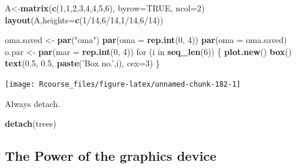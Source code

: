 \documentclass[]{book}
\newenvironment{Shaded}{\begin{snugshade}}{\end{snugshade}}
\newcommand{\KeywordTok}[1]{\textcolor[rgb]{0.13,0.29,0.53}{\textbf{{#1}}}}
\newcommand{\DataTypeTok}[1]{\textcolor[rgb]{0.13,0.29,0.53}{{#1}}}
\newcommand{\DecValTok}[1]{\textcolor[rgb]{0.00,0.00,0.81}{{#1}}}
\newcommand{\FloatTok}[1]{\textcolor[rgb]{0.00,0.00,0.81}{{#1}}}
\newcommand{\StringTok}[1]{\textcolor[rgb]{0.31,0.60,0.02}{{#1}}}
\newcommand{\OtherTok}[1]{\textcolor[rgb]{0.56,0.35,0.01}{{#1}}}
\newcommand{\NormalTok}[1]{{#1}}
\theoremstyle{definition}
\theoremstyle{definition}
\theoremstyle{remark}
\begin{document}
\begin{Shaded}
\begin{Highlighting}[]
\NormalTok{A<-}\KeywordTok{matrix}\NormalTok{(}\KeywordTok{c}\NormalTok{(}\DecValTok{1}\NormalTok{,}\DecValTok{1}\NormalTok{,}\DecValTok{2}\NormalTok{,}\DecValTok{3}\NormalTok{,}\DecValTok{4}\NormalTok{,}\DecValTok{4}\NormalTok{,}\DecValTok{5}\NormalTok{,}\DecValTok{6}\NormalTok{), }\DataTypeTok{byrow=}\OtherTok{TRUE}\NormalTok{, }\DataTypeTok{ncol=}\DecValTok{2}\NormalTok{)}
\KeywordTok{layout}\NormalTok{(A,}\DataTypeTok{heights=}\KeywordTok{c}\NormalTok{(}\DecValTok{1}\NormalTok{/}\DecValTok{14}\NormalTok{,}\DecValTok{6}\NormalTok{/}\DecValTok{14}\NormalTok{,}\DecValTok{1}\NormalTok{/}\DecValTok{14}\NormalTok{,}\DecValTok{6}\NormalTok{/}\DecValTok{14}\NormalTok{))}

\NormalTok{oma.saved <-}\StringTok{ }\KeywordTok{par}\NormalTok{(}\StringTok{"oma"}\NormalTok{)}
\KeywordTok{par}\NormalTok{(}\DataTypeTok{oma =} \KeywordTok{rep.int}\NormalTok{(}\DecValTok{0}\NormalTok{, }\DecValTok{4}\NormalTok{))}
\KeywordTok{par}\NormalTok{(}\DataTypeTok{oma =} \NormalTok{oma.saved)}
\NormalTok{o.par <-}\StringTok{ }\KeywordTok{par}\NormalTok{(}\DataTypeTok{mar =} \KeywordTok{rep.int}\NormalTok{(}\DecValTok{0}\NormalTok{, }\DecValTok{4}\NormalTok{))}
\NormalTok{for (i in }\KeywordTok{seq_len}\NormalTok{(}\DecValTok{6}\NormalTok{)) \{}
    \KeywordTok{plot.new}\NormalTok{()}
    \KeywordTok{box}\NormalTok{()}
    \KeywordTok{text}\NormalTok{(}\FloatTok{0.5}\NormalTok{, }\FloatTok{0.5}\NormalTok{, }\KeywordTok{paste}\NormalTok{(}\StringTok{'Box no.'}\NormalTok{,i), }\DataTypeTok{cex=}\DecValTok{3}\NormalTok{)}
\NormalTok{\}}
\end{Highlighting}
\end{Shaded}

\texttt{[image: Rcourse\_files/figure-latex/unnamed-chunk-182-1]}

Always detach.

\begin{Shaded}
\begin{Highlighting}[]
\KeywordTok{detach}\NormalTok{(trees)}
\end{Highlighting}
\end{Shaded}

\subsection{The Power of the graphics
device}\label{the-power-of-the-graphics-device}
\end{document}
